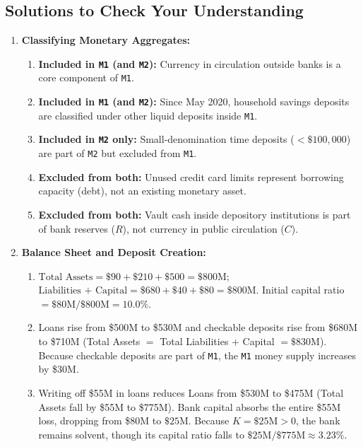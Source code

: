 \documentclass[11pt, oneside]{book}
\begin{document}
\subsection*{Solutions to Check Your Understanding}

\begin{enumerate}[leftmargin=1.5em, itemsep=6pt]
  \item \textbf{Classifying Monetary Aggregates:}
  \begin{enumerate}[label=(\alph*), itemsep=2pt]
    \item \textbf{Included in \texttt{M1} (and \texttt{M2}):} Currency in circulation outside banks is a core component of \texttt{M1}.
    \item \textbf{Included in \texttt{M1} (and \texttt{M2}):} Since May 2020, household savings deposits are classified under other liquid deposits inside \texttt{M1}.
    \item \textbf{Included in \texttt{M2} only:} Small-denomination time deposits ($<\$100{,}000$) are part of \texttt{M2} but excluded from \texttt{M1}.
    \item \textbf{Excluded from both:} Unused credit card limits represent borrowing capacity (debt), not an existing monetary asset.
    \item \textbf{Excluded from both:} Vault cash inside depository institutions is part of bank reserves ($R$), not currency in public circulation ($C$).
  \end{enumerate}

  \item \textbf{Balance Sheet and Deposit Creation:}
  \begin{enumerate}[label=(\alph*), itemsep=2pt]
    \item $\text{Total Assets} = \$90 + \$210 + \$500 = \$800\text{M}$; $\text{Liabilities + Capital} = \$680 + \$40 + \$80 = \$800\text{M}$. Initial capital ratio $= \$80\text{M} / \$800\text{M} = 10.0\%$.
    \item Loans rise from \$500M to \$530M and checkable deposits rise from \$680M to \$710M (Total Assets $=$ Total Liabilities + Capital $= \$830\text{M}$). Because checkable deposits are part of \texttt{M1}, the \texttt{M1} money supply increases by \$30M.
    \item Writing off \$55M in loans reduces Loans from \$530M to \$475M (Total Assets fall by \$55M to \$775M). Bank capital absorbs the entire \$55M loss, dropping from \$80M to $\$25\text{M}$. Because $K = \$25\text{M} > 0$, the bank remains solvent, though its capital ratio falls to $\$25\text{M} / \$775\text{M} \approx 3.23\%$.
  \end{enumerate}


\end{enumerate}
\end{document}
